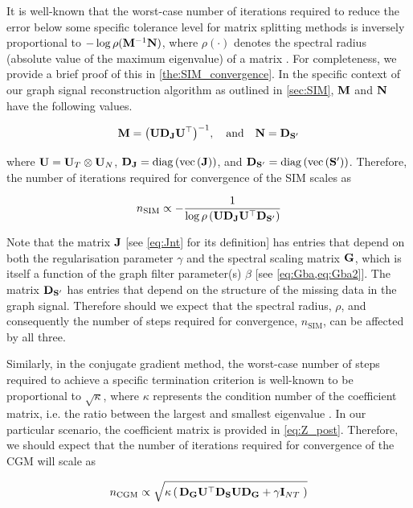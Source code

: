 It is well-known that the worst-case number of iterations required to reduce the error below some specific tolerance level for matrix splitting methods is inversely proportional to $-\log \rho(\mathbf{M}^{-1}\mathbf{N})$, where $\rho(\cdot)$ denotes the spectral radius (absolute value of the maximum eigenvalue) of a matrix \citep{Demmel1997}. For completeness, we provide a brief proof of this in \cref{the:SIM_convergence}. In the specific context of our graph signal reconstruction algorithm as outlined in \cref{sec:SIM}, $\mathbf{M}$ and $\mathbf{N}$ have the following values.  


$$
\mathbf{M} = \big(\mathbf{U} \mathbf{D}_{\mathbf{J}} \mathbf{U}^\top\big)^{-1}, \quad \text{and} \quad \mathbf{N} = \mathbf{D}_{\mathbf{S}'}
$$

where  $\mathbf{U} = \mathbf{U}_T \otimes \mathbf{U}_N$, $\mathbf{D}_{\mathbf{J}} = \text{\textup{diag}}\left(\text{\textup{vec}}\left(\mathbf{J}\right)\right)$, and $\mathbf{D}_{\mathbf{S}'} = \text{\textup{diag}}\left(\text{\textup{vec}}\left(\mathbf{S}'\right)\right)$. Therefore, the number of iterations required for convergence of the SIM scales as


\begin{equation}
    \label{eq:n_SIM}
    n_\text{SIM} \propto  -\frac{1}{\log\rho\left(\mathbf{U} \mathbf{D}_{\mathbf{J}} \mathbf{U}^\top \mathbf{D}_{\mathbf{S}'} \right)}
\end{equation}

Note that the matrix $\mathbf{J}$ [see \cref{eq:Jnt} for its definition] has entries that depend on both the regularisation parameter $\gamma$ and the spectral scaling matrix $\mathbf{G}$, which is itself a function of the graph filter parameter(s) $\beta$ [see \cref{eq:Gba,eq:Gba2}]. The matrix $\mathbf{D}_{\mathbf{S}'}$ has entries that depend on the structure of the missing data in the graph signal. Therefore should we expect that the spectral radius, $\rho$, and consequently the number of steps required for convergence, $n_\text{SIM}$, can be affected by all three.  

Similarly, in the conjugate gradient method, the worst-case number of steps required to achieve a specific termination criterion is well-known to be proportional to $\sqrt{\kappa}$, where $\kappa$ represents the condition number of the coefficient matrix, i.e. the ratio between the largest and smallest eigenvalue \cite{Kelley1995}. In our particular scenario, the coefficient matrix is provided in \cref{eq:Z_post}. Therefore, we should expect that the number of iterations required for convergence of the CGM will scale as

\begin{equation}
    \label{eq:n_CGM}
     n_\text{CGM} \propto \sqrt{\kappa \left(  \, \mathbf{D}_{\mathbf{G}} \mathbf{U}^\top \mathbf{D}_{\mathbf{S}} \mathbf{U} \mathbf{D}_{\mathbf{G}} + \gamma \mathbf{I}_{NT} \; \right)}
\end{equation}

